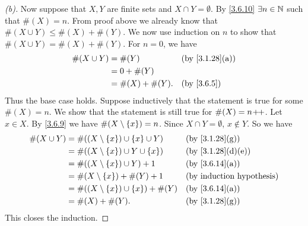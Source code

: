 \begin{proof}[(b)]
	Now suppose that \(X, Y\) are finite sets and \(X \cap Y = \emptyset\).
	By \cref{3.6.10} \(\exists n \in \mathbb{N}\) such that \(\#(X) = n\).
	From proof above we already know that \(\#(X \cup Y) \leq \#(X) + \#(Y)\).
	We now use induction on \(n\) to show that \(\#(X \cup Y) = \#(X) + \#(Y)\).
	For \(n = 0\), we have
	\begin{align*}
		\#(X \cup Y) & = \#(Y)          &  & \text{(by \cref{3.1.28}(a))} \\
		             & = 0 + \#(Y)                                        \\
		             & = \#(X) + \#(Y). &  & \by{3.6.5}
	\end{align*}
	Thus the base case holds.
	Suppose inductively that the statement is true for some \(\#(X) = n\).
	We show that the statement is still true for \(\#(X) = n\!+\!\!+\).
	Let \(x \in X\).
	By \cref{3.6.9} we have \(\#(X \setminus \left\lbrace x\right\rbrace) = n\).
	Since \(X \cap Y = \emptyset\), \(x \notin Y\).
	So we have
	\begin{align*}
		\#(X \cup Y) & = \#((X \setminus \set{x}) \cup \set{x} \cup Y)  &  & \text{(by \cref{3.1.28}(g))}    \\
		             & = \#((X \setminus \set{x}) \cup Y \cup \set{x})  &  & \text{(by \cref{3.1.28}(d)(e))} \\
		             & = \#((X \setminus \set{x}) \cup Y) + 1           &  & \text{(by \cref{3.6.14}(a))}    \\
		             & = \#(X \setminus \set{x}) + \#(Y) + 1            &  & \byIH                           \\
		             & = \#((X \setminus \set{x}) \cup \set{x}) + \#(Y) &  & \text{(by \cref{3.6.14}(a))}    \\
		             & = \#(X) + \#(Y).                                 &  & \text{(by \cref{3.1.28}(g))}
	\end{align*}
	This closes the induction.
\end{proof}

